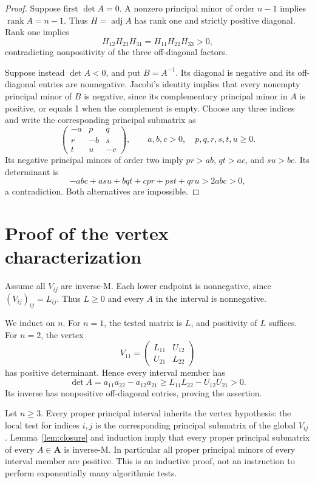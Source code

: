 \documentclass[11pt,a4paper]{article}
\theoremstyle{remark}\newtheorem{remark}[theorem]{Remark}
\newcommand{\adj}{\operatorname{adj}}
\newcommand{\rank}{\operatorname{rank}}
\begin{document}
\begin{proof}
Suppose first $\det A=0$. A nonzero principal minor of order $n-1$ implies $\rank A=n-1$. Thus $H=\adj A$ has rank one and strictly positive diagonal. Rank one implies
\[
 H_{12}H_{23}H_{31}=H_{11}H_{22}H_{33}>0,
\]
contradicting nonpositivity of the three off-diagonal factors.

Suppose instead $\det A<0$, and put $B=A^{-1}$. Its diagonal is negative and its off-diagonal entries are nonnegative. Jacobi's identity implies that every nonempty principal minor of $B$ is negative, since its complementary principal minor in $A$ is positive, or equals 1 when the complement is empty. Choose any three indices and write the corresponding principal submatrix as
\[
 \begin{pmatrix}-a&p&q\\r&-b&s\\t&u&-c\end{pmatrix},
 \qquad a,b,c>0,\quad p,q,r,s,t,u\ge0.
\]
Its negative principal minors of order two imply $pr>ab$, $qt>ac$, and $su>bc$. Its determinant is
\[
 -abc+a su+bqt+cpr+pst+qru>2abc>0,
\]
a contradiction. Both alternatives are impossible.
\end{proof}
\section{Proof of the vertex characterization}
Assume all $V_{ij}$ are inverse-M. Each lower endpoint is nonnegative, since $(V_{ij})_{ij}=L_{ij}$. Thus $L\ge0$ and every $A$ in the interval is nonnegative.

We induct on $n$. For $n=1$, the tested matrix is $L$, and positivity of $L$ suffices. For $n=2$, the vertex
\[
 V_{11}=\begin{pmatrix}L_{11}&U_{12}\\U_{21}&L_{22}\end{pmatrix}
\]
has positive determinant. Hence every interval member has
\[
 \det A=a_{11}a_{22}-a_{12}a_{21}
 \ge L_{11}L_{22}-U_{12}U_{21}>0.
\]
Its inverse has nonpositive off-diagonal entries, proving the assertion.

Let $n\ge3$. Every proper principal interval inherits the vertex hypothesis: the local test for indices $i,j$ is the corresponding principal submatrix of the global $V_{ij}$. Lemma~\ref{lem:closure} and induction imply that every proper principal submatrix of every $A\in\boldsymbol A$ is inverse-M. In particular all proper principal minors of every interval member are positive. This is an inductive proof, not an instruction to perform exponentially many algorithmic tests.
\end{document}
